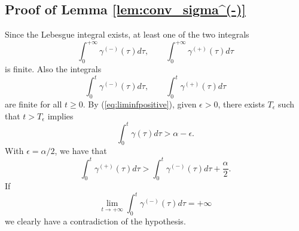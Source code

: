 \documentclass[letterpaper,10pt,conference,twocolumn]{IEEEtran}
\newcommand{\eps}{\epsilon}
\begin{document}
\begin{appendix}
\subsection{Proof of Lemma \ref{lem:conv_sigma^(-)}}
	Since the Lebesgue integral exists, at least one of the two integrals
	\begin{equation*}
		\int_0^{+\infty}\gamma^{(-)}(\tau)d\tau,
			\qquad
		\int_0^{+\infty}\gamma^{(+)}(\tau)d\tau
	\end{equation*}
	is finite. Also the integrals
	\begin{equation*}
		\int_0^{t}\gamma^{(-)}(\tau)d\tau,
			\qquad
		\int_0^{t}\gamma^{(+)}(\tau)d\tau
	\end{equation*}
	are finite for all $t\geq 0$.
	By (\ref{eq:liminfpositive}), given $\eps>0$,
	there exists $T_{\eps}$ such that $t>T_{\eps}$ implies
	\begin{equation*}
			\int_0^{t}\gamma(\tau)d\tau>\alpha-\eps.
	\end{equation*}
	With $\eps=\alpha/2$, we have that
	\begin{equation*}
		\int_0^{t}\gamma^{(+)}(\tau)d\tau>
			\int_0^{t}\gamma^{(-)}(\tau)d\tau+\frac{\alpha}{2}.
	\end{equation*}
	If
	\begin{equation*}
		\lim_{t\rightarrow +\infty}\int_0^{t}\gamma^{(-)}(\tau)d\tau=+\infty
	\end{equation*}
	we clearly have a contradiction of the hypothesis.


\end{appendix}
\end{document}
